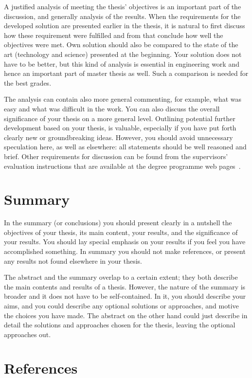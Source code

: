 A justified analysis of meeting the thesis’ objectives is an important part of the discussion, and generally analysis of the results. When the requirements for the developed solution are presented earlier in the thesis, it is natural to first discuss how these requirement were fulfilled and from that conclude how well the objectives were met. Own solution should also be compared to the state of the art (technology and science) presented at the beginning. Your solution does not have to be better, but this kind of analysis is essential in engineering work and hence an important part of master thesis as well. Such a comparison is needed for the best grades.

The analysis can contain also more general commenting, for example, what was easy and what was difficult in the work. You can also discuss the overall significance of your thesis on a more general level. Outlining potential further development based on your thesis, is valuable, especially if you have put forth clearly new or groundbreaking ideas. However, you should avoid unnecessary speculation here, as well as elsewhere: all statements should be well reasoned and brief. Other requirements for discussion can be found from the supervisors’ evaluation instructions that are available at the degree programme web pages~\cite{mscstudies}.

\section{Summary}

In the summary (or conclusions) you should present clearly in a nutshell the objectives of your thesis, its main content, your results, and the significance of your results. You should lay special emphasis on your results if you feel you have accomplished something. In summary you should not make references, or present any results not found elsewhere in your thesis.

The abstract and the summary overlap to a certain extent; they both describe the main contents and results of a thesis. However, the nature of the summary is broader and it does not have to be self-contained. In it, you should describe your aims, and you could describe any optional solutions or approaches, and motive the choices you have made. The abstract on the other hand could just describe in detail the solutions and approaches chosen for the thesis, leaving the optional approaches out.

\section{References}

